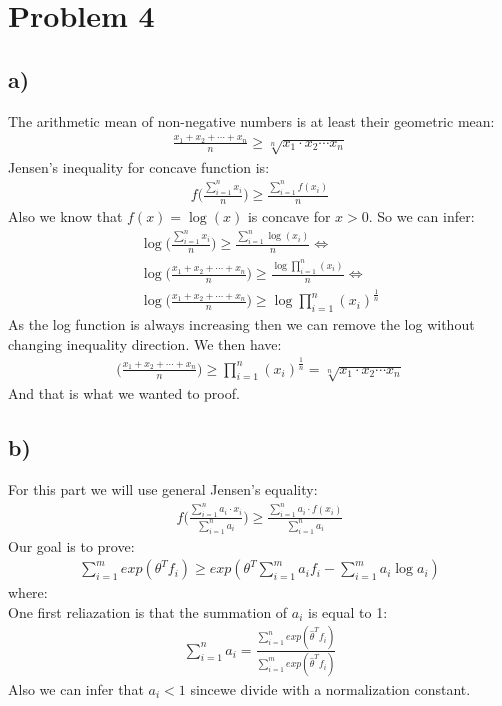 \section*{Problem 4}
\subsection*{a)}
The arithmetic mean of non-negative numbers is at least their geometric mean:
\begin{align*}
\frac{x_1 + x_2 + \cdots + x_n}{n} \geq \sqrt[n]{x_1 \cdot  x_2  \cdots x_n}
\end{align*}
Jensen's inequality for concave function is:
\begin{align*}
f\bigg(\frac{\displaystyle\sum_{i=1}^{n}x_i}{n}\bigg) \geq \frac{\displaystyle\sum_{i=1}^{n}f(x_i)}{n}
\end{align*}
Also we know that $f(x) = \log(x)$ is concave for $x > 0$. So we can infer:
\begin{align*}
\log\bigg(\frac{\displaystyle\sum_{i=1}^{n}x_i}{n}\bigg) \geq \frac{\displaystyle\sum_{i=1}^{n}\log(x_i)}{n} \Leftrightarrow \\
\log\bigg(\frac{x_1 + x_2 + \cdots + x_n}{n}\bigg) \geq \frac{\log\displaystyle\prod_{i=1}^{n}(x_i)}{n} \Leftrightarrow \\
\log\bigg(\frac{x_1 + x_2 + \cdots + x_n}{n}\bigg) \geq \log\displaystyle\prod_{i=1}^{n}(x_i)^\frac{1}{n}
\end{align*}
As the log function is always increasing then we can remove the log without changing inequality direction.
We then have:
\begin{align*}
\bigg(\frac{x_1 + x_2 + \cdots + x_n}{n}\bigg) \geq \displaystyle\prod_{i=1}^{n}(x_i)^\frac{1}{n} = \sqrt[n]{x_1 \cdot  x_2  \cdots x_n}
\end{align*}
And that is what we wanted to proof.
\subsection*{b)}
For this part we will use general Jensen's equality:
\begin{align*}
f\bigg(\frac{\displaystyle\sum_{i=1}^{n}a_i \cdot x_i}{\displaystyle\sum_{i=1}^{n}a_i}\bigg) \geq \frac{\displaystyle\sum_{i=1}^{n}a_i\cdot f(x_i)}{\displaystyle\sum_{i=1}^{n}a_i}
\end{align*}
Our goal is to prove:
\begin{align}\label{eq:one}
\displaystyle\sum_{i=1}^{m}exp(\theta^T f_i) \geq exp(\theta^T \displaystyle\sum_{i=1}^{m}a_i f_i - \displaystyle\sum_{i=1}^{m}a_i\log a_i)
\end{align}
where:\\
One first reliazation is that the summation of $a_i$ is equal to 1:
\begin{align*}
\displaystyle\sum_{i=1}^{n}a_i = \frac{\displaystyle\sum_{i=1}^{n}exp(\hat{\theta}^T f_i)}{\displaystyle\sum_{i=1}^{m}exp(\hat{\theta}^T f_i)}
\end{align*}
Also we can infer that $a_i < 1$ sincewe divide with a normalization constant.\\


